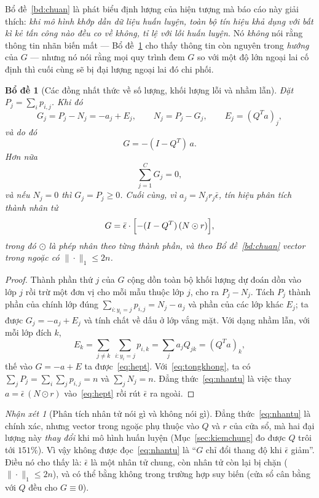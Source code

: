 \documentclass[11pt]{article}
\newtheorem{bode}[dinhly]{Bổ đề}
\theoremstyle{remark}
\newtheorem{nhanxet}[dinhly]{Nhận xét}
\begin{document}
Bổ đề~\ref{bd:chuan} là phát biểu định lượng của hiện tượng mà báo cáo này
giải thích: \emph{khi mô hình khớp dần dữ liệu huấn luyện, toàn bộ tín hiệu
khả dụng với bất kì kẻ tấn công nào đều co về không, tỉ lệ với lỗi huấn
luyện.} Nó \emph{không} nói rằng thông tin nhãn biến mất ---
Bổ đề~\ref{bd:dongnhat} cho thấy thông tin còn nguyên trong \emph{hướng} của
$G$ --- nhưng nó nói rằng mọi quy trình đem $G$ so với một độ lớn ngoại lai
cố định thì cuối cùng sẽ bị đại lượng ngoại lai đó chi phối.

\begin{bode}[Các đồng nhất thức về số lượng, khối lượng lỗi và nhầm lẫn]
\label{bd:dongnhat}
Đặt $P_j = \sum_i p_{i,j}$. Khi đó
\[
 G_j = P_j - N_j = -a_j + E_j,
 \qquad N_j = P_j - G_j,
 \qquad E_j = (Q^Ta)_j ,
\]
và do đó
\begin{equation}
 G = -(I - Q^T)\,a .
 \label{eq:hept}
\end{equation}
Hơn nữa
\begin{equation}
 \sum_{j=1}^C G_j = 0 ,
 \label{eq:tongkhong}
\end{equation}
và nếu $N_j = 0$ thì $G_j = P_j \ge 0$. Cuối cùng, vì
$a_j = N_j r_j \bar\epsilon$, tín hiệu \emph{phân tích thành nhân tử}
\begin{equation}
 G = \bar\epsilon \cdot \Bigl[-(I-Q^T)\,(N \odot r)\Bigr],
 \label{eq:nhantu}
\end{equation}
trong đó $\odot$ là phép nhân theo từng thành phần, và theo
Bổ đề~\ref{bd:chuan} vector trong ngoặc có $\|\cdot\|_1 \le 2n$.
\end{bode}

\begin{proof}
Thành phần thứ $j$ của $G$ cộng dồn toàn bộ khối lượng dự đoán dồn vào lớp
$j$ rồi trừ một đơn vị cho mỗi mẫu thuộc lớp $j$, cho ra $P_j - N_j$. Tách
$P_j$ thành phần của chính lớp đúng
$\sum_{i:y_i=j}p_{i,j} = N_j - a_j$ và phần của các lớp khác $E_j$; ta được
$G_j = -a_j + E_j$ và tính chất về dấu ở lớp vắng mặt. Với dạng nhầm lẫn, với
mỗi lớp đích $k$,
\[
 E_k = \sum_{j \ne k}\ \sum_{i : y_i = j} p_{i,k}
     = \sum_j a_j Q_{jk} = (Q^Ta)_k ,
\]
thế vào $G = -a + E$ ta được~\eqref{eq:hept}. Với~\eqref{eq:tongkhong}, ta có
$\sum_j P_j = \sum_i \sum_j p_{i,j} = n$ và $\sum_j N_j = n$.
Đẳng thức~\eqref{eq:nhantu} là việc thay $a = \bar\epsilon\,(N\odot r)$
vào~\eqref{eq:hept} rồi rút $\bar\epsilon$ ra ngoài.
\end{proof}

\begin{nhanxet}[Phân tích nhân tử nói gì và không nói gì]
Đẳng thức~\eqref{eq:nhantu} là chính xác, nhưng vector trong ngoặc phụ thuộc
vào $Q$ và $r$ của cửa sổ, mà hai đại lượng này \emph{thay đổi} khi mô hình
huấn luyện (Mục~\ref{sec:kiemchung} đo được $Q$ trôi tới $151\%$). Vì vậy
không được đọc~\eqref{eq:nhantu} là ``$G$ chỉ đổi thang độ khi $\bar\epsilon$
giảm''. Điều nó cho thấy là: $\bar\epsilon$ là một nhân tử chung, còn nhân
tử còn lại bị chặn ($\|\cdot\|_1\le 2n$), và có thể bằng không trong trường
hợp suy biến (cửa sổ cân bằng với $Q$ đều cho $G \equiv 0$).
\end{nhanxet}
\end{document}
